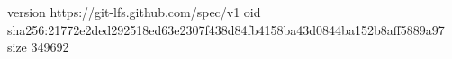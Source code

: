 version https://git-lfs.github.com/spec/v1
oid sha256:21772e2ded292518ed63e2307f438d84fb4158ba43d0844ba152b8aff5889a97
size 349692
